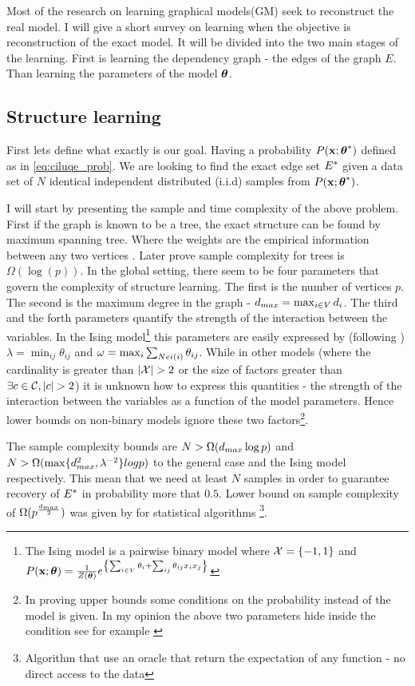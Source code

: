 Most of the research on learning graphical models(GM) seek to reconstruct the real model.
I will give a short survey on learning when the objective is reconstruction of the exact model.
It will be divided into the two main stages of the learning.
First is learning the dependency graph - the edges of the graph $E$.
Than learning the parameters of the model $\boldsymbol{\theta}$.
\subsection{Structure learning}
First lets define what exactly is our goal.
Having a probability $P({\bf x};{\boldsymbol{\theta}}^{*})$ defined as in \eqref{eq:ciluqe_prob}.
We are looking to find the exact edge set ${E}^{*}$ given a data set of $N$ identical independent distributed (i.i.d) samples from $P({\bf x};{\boldsymbol{\theta}}^{*})$.

I will start by presenting the sample and time complexity of the above problem. 
First if the graph is known to be a tree, the exact structure can be found by maximum spanning tree.  Where the  weights are the empirical information between any two vertices \cite{chowLiu}. 
Later \cite{tan2011learning} prove sample complexity for trees is $\Omega(\log(p))$.
In the global setting, there seem to be four parameters that govern the complexity of structure learning.
The first is  the number of vertices $p$.
The second is the maximum degree in the graph - $d_{max} = \max_{i \in V} d_i$.
The third and the forth parameters quantify the strength of the interaction between the variables.
In the Ising model\footnote{ The Ising model is a pairwise binary model where ${\cal X} = \{-1,1\}$ and $P({\bf x};\boldsymbol{\theta}) = \frac{1}{Z(\boldsymbol{\theta})} e^{\left\{\sum_{i \in V}\theta_i + \sum_{ij}\theta_{ij}x_ix_j\right\}}$} this parameters are easily expressed by (following \cite{santhanam2012information}) $\lambda = \min_{ij} \theta_{ij}$ and $\omega = \max_i \sum_{Nei(i)} \theta_{ij}$.
While in other models (where the cardinality is greater than $|\cX|>2$ or the size of factors greater than $\exists c \in \cC, |c|>2$) it is unknown how to express this quantities - the strength of the interaction between the variables as a function of the model parameters.
Hence lower bounds  on non-binary models ignore these two factors\footnote{In proving upper bounds some conditions on the probability instead of the model is given. In my opinion the above two parameters hide inside the condition see for example \cite{bresler2008reconstruction}}.

The sample complexity bounds are $N > \Omega(d_{max} \log p)$ and $N > \Omega(\max\{d_{max}^2, \lambda^{-2}\}log p) $ to the general case and the Ising model respectively. This mean that we need at least $N$ samples in order to guarantee recovery of ${E}^{*}$ in probability more that $0.5$.
Lower bound on sample complexity of $\Omega(p^{\frac{d_{max}}{2}})$ was given by \cite{bresler2014structure} for statistical algorithms \cite{feldman2013statistical}\footnote{Algorithm that use an oracle that return the expectation of any function - no direct access to the data}.

